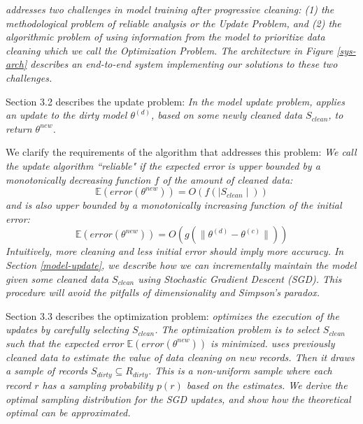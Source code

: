 \vspace{0.25em}

\emph{\sys addresses two challenges in model training after progressive cleaning: (1) the methodological problem of reliable analysis or the \emph{Update Problem}, and (2) the algorithmic problem of using information from the model to prioritize data cleaning which we call the \emph{Optimization Problem}.
The \sys architecture in Figure \ref{sys-arch} describes an end-to-end system implementing our solutions to these two challenges.}

\vspace{0.25em}

Section 3.2 describes the update problem:
\emph{In the model update problem, \sys applies an update to the dirty model $\theta^{(d)}$, based on some newly cleaned data $S_{clean}$, to return $\theta^{new}$.}

We clarify the requirements of the algorithm that addresses this problem:
\emph{We call the update algorithm ``reliable" if the expected error is upper bounded by a monotonically decreasing function $f$ of the amount of cleaned data:
\[
\mathbb{E}(error(\theta^{new})) = O(f(\mid S_{clean} \mid))
\]
and is also upper bounded by a monotonically increasing function of the initial error:
\[
\mathbb{E}(error(\theta^{new})) = O(g(\| \theta^{(d)} - \theta^{(c)} \|))
\]
Intuitively, more cleaning and less initial error should imply more accuracy.
In Section \ref{model-update}, we describe how we can incrementally maintain the model given some cleaned data $S_{clean}$ using Stochastic Gradient Descent (SGD).
This procedure will avoid the pitfalls of dimensionality and Simpson's paradox.}

\vspace{0.25em}

Section 3.3 describes the optimization problem:
\emph{\sys optimizes the execution of the updates by carefully selecting $S_{clean}$.
The optimization problem is to select $S_{clean}$ such that the expected error $\mathbb{E}(error(\theta^{new}))$ is minimized.
\sys uses previously cleaned data to estimate the value of data cleaning on new records.
Then it draws a sample of records $S_{dirty} \subseteq R_{dirty}$. This is a non-uniform sample where each record $r$ has a sampling probability $p(r)$ based on the estimates.
We derive the optimal sampling distribution for the SGD updates, and show how the theoretical optimal can be approximated.
}

\vspace{0.25em}

